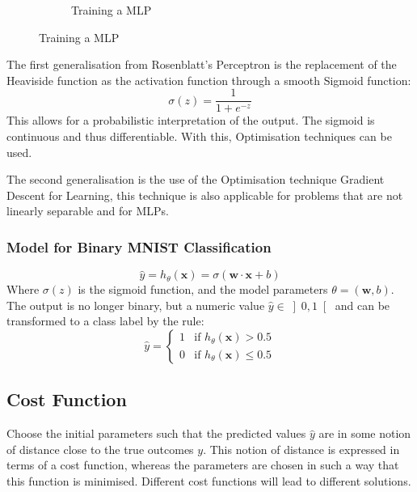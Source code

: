 \documentclass[11pt]{article}
\begin{document}
\begin{figure}[htb]
\begin{subfigure}[b]{0.3\textwidth}
		\caption{Training a MLP}
		\label{fig:mlptraining}
	\end{subfigure}
\end{figure}

The first generalisation from Rosenblatt's Perceptron is the replacement of the Heaviside function as the activation function through a smooth Sigmoid function:
\begin{equation*}
	\sigma(z) = \frac{1}{1+e^{-z}}
\end{equation*}
\noindent
This allows for a probabilistic interpretation of the output. The sigmoid is continuous and thus differentiable. With this, Optimisation techniques can be used.

The second generalisation is the use of the Optimisation technique Gradient Descent for Learning, this technique is also applicable for problems that are not linearly separable and for MLPs.

\subsubsection{Model for Binary MNIST Classification}

\begin{equation*}
	\hat{y} = h_\theta (\textbf{x}) = \sigma(\textbf{w}\cdot\textbf{x} + b)
\end{equation*}
\noindent
Where $\sigma(z)$ is the sigmoid function, and the model parameters $\theta =(\textbf{w}, b)$. The output is no longer binary, but a numeric value $\hat{y}\in\left]0,1\right[$ and can be transformed to a class label by the rule:
\begin{equation*}
	\hat{y} = \left\{ \begin{matrix}
		1 & \text{if } h_\theta(\textbf{x}) > 0.5\\
		0 & \text{if } h_\theta(\textbf{x}) \leq 0.5
		\end{matrix} \right.
\end{equation*}

\subsection{Cost Function}
Choose the initial parameters such that the predicted values $\hat{y}$ are in some notion of distance close to the true outcomes $y$. This notion of distance is expressed in terms of a cost function, whereas the parameters are chosen in such a way that this function is minimised. Different cost functions will lead to different solutions.
\end{document}
